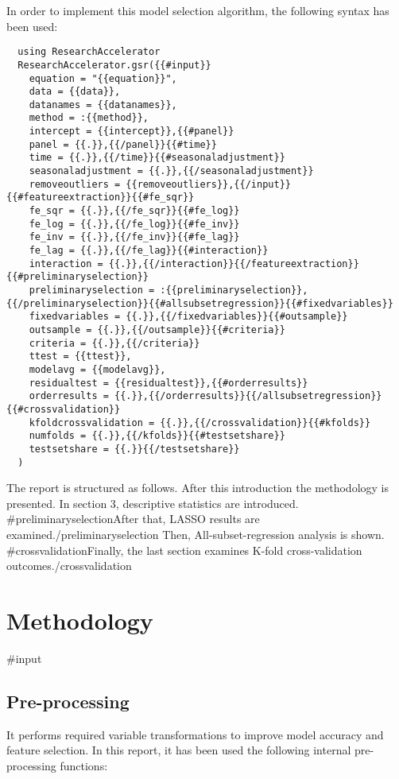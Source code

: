 \documentclass{article}
\begin{document}
In order to implement this model selection algorithm, the following syntax has been used:

\begin{lstlisting} 
  using ResearchAccelerator
  ResearchAccelerator.gsr({{#input}}
    equation = "{{equation}}",
    data = {{data}},
    datanames = {{datanames}},
    method = :{{method}},
    intercept = {{intercept}},{{#panel}}
    panel = {{.}},{{/panel}}{{#time}}
    time = {{.}},{{/time}}{{#seasonaladjustment}}
    seasonaladjustment = {{.}},{{/seasonaladjustment}}
    removeoutliers = {{removeoutliers}},{{/input}}{{#featureextraction}}{{#fe_sqr}}
    fe_sqr = {{.}},{{/fe_sqr}}{{#fe_log}}
    fe_log = {{.}},{{/fe_log}}{{#fe_inv}}
    fe_inv = {{.}},{{/fe_inv}}{{#fe_lag}}
    fe_lag = {{.}},{{/fe_lag}}{{#interaction}}
    interaction = {{.}},{{/interaction}}{{/featureextraction}}{{#preliminaryselection}}
    preliminaryselection = :{{preliminaryselection}},{{/preliminaryselection}}{{#allsubsetregression}}{{#fixedvariables}}
    fixedvariables = {{.}},{{/fixedvariables}}{{#outsample}}
    outsample = {{.}},{{/outsample}}{{#criteria}}
    criteria = {{.}},{{/criteria}}
    ttest = {{ttest}},
    modelavg = {{modelavg}},
    residualtest = {{residualtest}},{{#orderresults}}
    orderresults = {{.}},{{/orderresults}}{{/allsubsetregression}}{{#crossvalidation}}
    kfoldcrossvalidation = {{.}},{{/crossvalidation}}{{#kfolds}}
    numfolds = {{.}},{{/kfolds}}{{#testsetshare}}
    testsetshare = {{.}}{{/testsetshare}}
  )
\end{lstlisting}

The report is structured as follows. After this introduction the methodology is presented. In section 3, descriptive statistics are introduced. {{#preliminaryselection}}After that, LASSO results are examined.{{/preliminaryselection}} Then, All-subset-regression analysis is shown. {{#crossvalidation}}Finally, the last section examines K-fold cross-validation outcomes.{{/crossvalidation}}

\section{Methodology}

{{#input}}
\subsection{Pre-processing}
It performs required variable transformations to improve model accuracy and feature selection. In this report, it has been used the following internal pre-processing functions:
\end{document}
